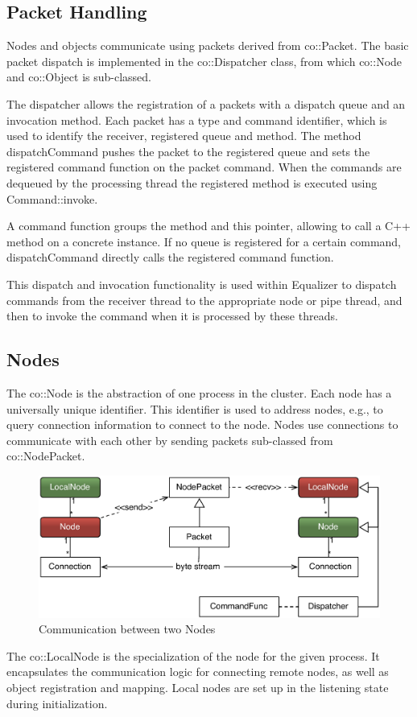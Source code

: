 \documentclass[10pt,a4]{scrartcl}
\begin{document}
\subsection{Packet Handling}

Nodes and objects communicate using packets derived from
\textsf{co::Packet}. The basic packet dispatch is implemented in the
\textsf{co::Dispatcher} class, from which \textsf{co::Node} and \textsf{co::Object} is sub-classed.

The dispatcher allows the registration of a packets with a dispatch queue and an
invocation method. Each packet has a type and command identifier, which is used
to identify the receiver, registered queue and method. The method
\textsf{dispatchCommand} pushes the packet to the registered queue and sets the
registered command function on the packet command. When the
commands are dequeued by the processing thread the registered method is executed
using \textsf{Command::invoke}.

A command function groups the method and \textsf{this} pointer, allowing
to call a C++ method on a concrete instance. If no queue is registered
for a certain command, \textsf{dispatchCommand} directly calls the
registered command function.

This dispatch and invocation functionality is used within Equalizer to
dispatch commands from the receiver thread to the appropriate node or
pipe thread, and then to invoke the command when it is processed by
these threads.

\subsection{Nodes}

The \textsf{co::Node} is the abstraction of one process in the cluster. Each
node has a universally unique identifier. This identifier is used to address
nodes, e.g., to query connection information to connect to the node. Nodes use
connections to communicate with each other by sending packets sub-classed from
\textsf{co::NodePacket}.

\begin{figure}
  \includegraphics[width=.618\textwidth]{images/netNode.pdf}
  {\caption{\label{fNetNode}Communication between two Nodes}}
\end{figure}
The \textsf{co::LocalNode} is the specialization of the node for the given
process. It encapsulates the communication logic for connecting remote nodes, as
well as object registration and mapping. Local nodes are set up in the listening
state during initialization.
\end{document}
